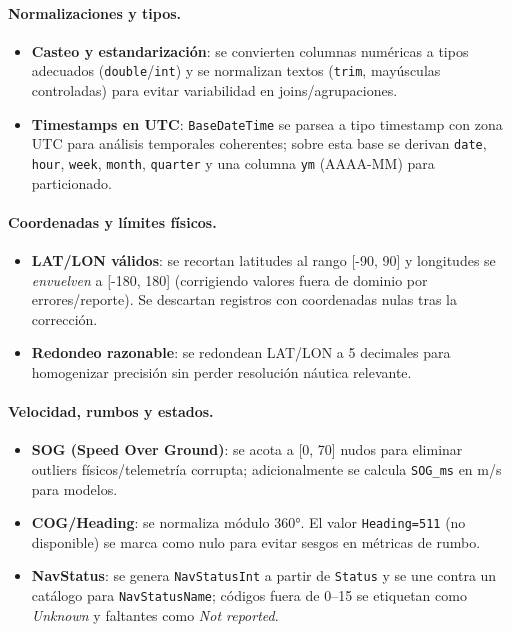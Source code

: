 \documentclass[10pt]{article}
\begin{document}
\paragraph{Normalizaciones y tipos.}
\begin{itemize}
  \item \textbf{Casteo y estandarización}: se convierten columnas numéricas a tipos adecuados (\texttt{double}/\texttt{int}) y se normalizan textos (\texttt{trim}, mayúsculas controladas) para evitar variabilidad en joins/agrupaciones.
  \item \textbf{Timestamps en UTC}: \texttt{BaseDateTime} se parsea a tipo timestamp con zona UTC para análisis temporales coherentes; sobre esta base se derivan \texttt{date}, \texttt{hour}, \texttt{week}, \texttt{month}, \texttt{quarter} y una columna \texttt{ym} (AAAA-MM) para particionado.
\end{itemize}

\paragraph{Coordenadas y límites físicos.}
\begin{itemize}
  \item \textbf{LAT/LON válidos}: se recortan latitudes al rango [-90, 90] y longitudes se \emph{envuelven} a [-180, 180] (corrigiendo valores fuera de dominio por errores/reporte). Se descartan registros con coordenadas nulas tras la corrección.
  \item \textbf{Redondeo razonable}: se redondean LAT/LON a 5 decimales para homogenizar precisión sin perder resolución náutica relevante.
\end{itemize}

\paragraph{Velocidad, rumbos y estados.}
\begin{itemize}
  \item \textbf{SOG (Speed Over Ground)}: se acota a [0, 70] nudos para eliminar outliers físicos/telemetría corrupta; adicionalmente se calcula \texttt{SOG\_ms} en m/s para modelos.
  \item \textbf{COG/Heading}: se normaliza módulo 360°. El valor \texttt{Heading=511} (no disponible) se marca como nulo para evitar sesgos en métricas de rumbo.
  \item \textbf{NavStatus}: se genera \texttt{NavStatusInt} a partir de \texttt{Status} y se une contra un catálogo para \texttt{NavStatusName}; códigos fuera de 0–15 se etiquetan como \textit{Unknown} y faltantes como \textit{Not reported}.
\end{itemize}
\end{document}
